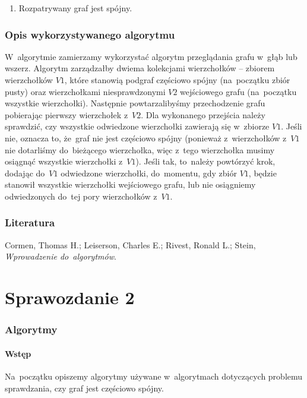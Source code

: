 \documentclass[a4paper,12pt]{mwart}
\begin{document}
\begin{enumerate}
\item Rozpatrywany graf jest spójny.
\end{enumerate}

\section{Opis wykorzystywanego algorytmu}

W~algorytmie zamierzamy wykorzystać algorytm przeglądania grafu w~głąb lub
wszerz. Algorytm zarządzałby dwiema kolekcjami wierzchołków -- zbiorem
wierzchołków $V1$, które stanowią podgraf częściowo spójny (na~początku zbiór
pusty) oraz wierzchołkami niesprawdzonymi $V2$ wejściowego grafu (na~początku
wszystkie wierzchołki). Następnie powtarzalibyśmy przechodzenie grafu
pobierając pierwszy wierzchołek z~$V2$. Dla wykonanego przejścia należy
sprawdzić, czy wszystkie odwiedzone wierzchołki zawierają się w~zbiorze $V1$.
Jeśli nie, oznacza to, że~graf nie jest częściowo spójny (ponieważ
z~wierzchołków z~$V1$ nie dotarliśmy do~bieżącego wierzchołka, więc z~tego
wierzchołka musimy osiągnąć wszystkie wierzchołki z~$V1$). Jeśli tak, to~należy
powtórzyć krok, dodając do~$V1$ odwiedzone wierzchołki, do~momentu, gdy zbiór
$V1$, będzie stanowił wszystkie wierzchołki wejściowego grafu, lub nie
osiągniemy odwiedzonych do~tej pory wierzchołków z~$V1$.

\section{Literatura}

\noindent Cormen, Thomas H.; Leiserson, Charles E.; Rivest, Ronald L.; Stein,
\emph{Wprowadzenie do~algorytmów}.

\newpage

\part{Sprawozdanie 2}

\section{Algorytmy}

\subsection{Wstęp}

Na~początku opiszemy algorytmy używane w~algorytmach dotyczących problemu
sprawdzania, czy graf jest częściowo spójny.
\end{document}
